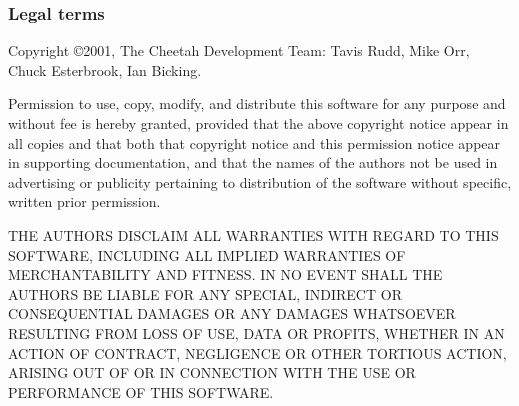 \subsubsection{Legal terms}
Copyright \copyright 2001, The Cheetah Development Team: Tavis Rudd, Mike Orr,
Chuck Esterbrook, Ian Bicking.

Permission to use, copy, modify, and distribute this software for any purpose
and without fee is hereby granted, provided that the above copyright notice
appear in all copies and that both that copyright notice and this permission
notice appear in supporting documentation, and that the names of the authors not
be used in advertising or publicity pertaining to distribution of the software
without specific, written prior permission.

THE AUTHORS DISCLAIM ALL WARRANTIES WITH REGARD TO THIS SOFTWARE, INCLUDING ALL
IMPLIED WARRANTIES OF MERCHANTABILITY AND FITNESS. IN NO EVENT SHALL THE AUTHORS
BE LIABLE FOR ANY SPECIAL, INDIRECT OR CONSEQUENTIAL DAMAGES OR ANY DAMAGES
WHATSOEVER RESULTING FROM LOSS OF USE, DATA OR PROFITS, WHETHER IN AN ACTION OF
CONTRACT, NEGLIGENCE OR OTHER TORTIOUS ACTION, ARISING OUT OF OR IN CONNECTION
WITH THE USE OR PERFORMANCE OF THIS SOFTWARE.

